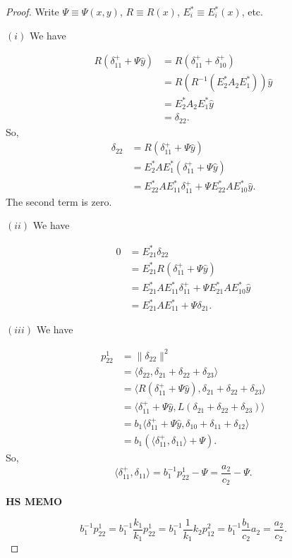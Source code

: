 \documentclass[
]{book}
\theoremstyle{definition}
\theoremstyle{definition}
\theoremstyle{definition}
\theoremstyle{definition}
\theoremstyle{remark}
\begin{document}
\begin{proof}

Write \(\Psi \equiv \Psi(x,y)\), \(R \equiv R(x)\), \(E^*_i \equiv E^*_i(x)\), etc.

\((i)\) We have

\begin{align}
R(\delta^+_{11} + \Psi \hat{y}) & = R(\delta^+_{11} + \delta^+_{10})\\
& = R(R^{-1}(E^*_2A_2E^*_1))\hat{y}\\
& = E^*_2A_2E^*_1\hat{y}\\
& = \delta_{22}.
\end{align}
So,
\begin{align}
\delta_{22} & = R(\delta^+_{11} + \Psi \hat{y})\\
& = E^*_2AE^*_1(\delta^+_{11} + \Psi \hat{y})\\
& = E^*_{22}AE^*_{11}\delta^+_{11} + \Psi E^*_{22}A E^*_{10}\hat{y}.
\end{align}
The second term is zero.

\((ii)\) We have

\begin{align}
0 & = E^*_{21}\delta_{22}\\
& = E^*_{21}R(\delta^+_{11} + \Psi \hat{y})\\
& = E^*_{21}AE^*_{11}\delta^+_{11} + \Psi E^*_{21}AE^*_{10}\hat{y}\\
& = E^*_{21}AE^*_{11} + \Psi \delta_{21}.
\end{align}

\((iii)\) We have

\begin{align}
p^{1}_{22} & = \|\delta_{22}\|^2 \\
& = \langle \delta_{22}, \delta_{21}+\delta_{22}+\delta_{23}\rangle\\
& = \langle R(\delta^+_{11} + \Psi \hat{y}), \delta_{21}+\delta_{22}+\delta_{23}\rangle\\
& = \langle \delta^+_{11} + \Psi \hat{y}, L(\delta_{21}+\delta_{22}+\delta_{23})\rangle\\
& = b_1\langle \delta^+_{11} + \Psi \hat{y}, \delta_{10}+\delta_{11}+\delta_{12}\rangle\\
& = b_1(\langle \delta^+_{11}, \delta_{11}\rangle + \Psi).
\end{align}
So,
\[\langle \delta^+_{11}, \delta_{11}\rangle = b_1^{-1}p^{1}_{22}- \Psi = \frac{a_2}{c_2}-\Psi.\]

\textbf{HS MEMO}

\[b^{-1}_1p^1_{22} = b^{-1}_1\frac{k_1}{k_1}p^1_{22} = b^{-1}_1\frac{1}{k_1}k_2p^{2}_{12} = b^{-1}_1\frac{b_1}{c_2}a_2 = \frac{a_2}{c_2}.\]


\end{proof}
\end{document}
